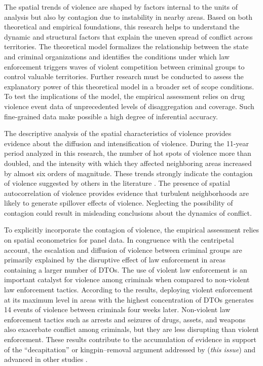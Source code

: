\documentclass[12pt,letterpaper]{article}
\begin{document}
The spatial trends of violence are shaped by factors internal to the units of analysis but also by contagion due to instability in nearby areas. Based on both theoretical and empirical foundations, this research helps to understand the dynamic and structural factors that explain the uneven spread of conflict across territories. The theoretical model formalizes the relationship between the state and criminal organizations and identifies the conditions under which law enforcement triggers waves of violent competition between criminal groups to control valuable territories. Further research must be conducted to assess the explanatory power of this theoretical model in a broader set of scope conditions. To test the implications of the model, the empirical assessment relies on drug violence event data of unprecedented levels of disaggregation and coverage. Such fine-grained data make possible a high degree of inferential accuracy.  

The descriptive analysis of the spatial characteristics of violence provides evidence about the diffusion and intensification of violence. During the 11-year period analyzed in this research, the number of hot spots of violence more than doubled, and the intensity with which they affected neighboring areas increased by almost six orders of magnitude. These trends strongly indicate the contagion of violence suggested by others in the literature \citep{Guerrero2011a,Rios2011,Shirk2010,Molzahn2013}. The presence of spatial autocorrelation of violence provides evidence that turbulent neighborhoods are likely to generate spillover effects of violence. Neglecting the possibility of contagion could result in misleading conclusions about the dynamics of conflict. 

To explicitly incorporate the contagion of violence, the empirical assessment relies on spatial econometrics for panel data. In congruence with the centripetal account, the escalation and diffusion of violence between criminal groups are primarily explained by the disruptive effect of law enforcement in areas containing a larger number of DTOs. The use of violent law enforcement is an important catalyst for violence among criminals when compared to non-violent law enforcement tactics. According to the results, deploying violent enforcement at its maximum level in areas with the highest concentration of DTOs generates 14 events of violence between criminals four weeks later. Non-violent law enforcement tactics such as arrests and seizures of drugs, assets, and weapons also exacerbate conflict among criminals, but they are less disrupting than violent enforcement. These results contribute to the accumulation of evidence in support of the ``decapitation'' or kingpin--removal argument addressed by \citeauthor*{Shirkthisissue} (\emph{this issue}) and advanced in other studies \citep{Guerrero2011,Shirk2010,Astorga2005,Donnelly2010,Calderon2012,Dell2011,Osorio2013}.
\end{document}
